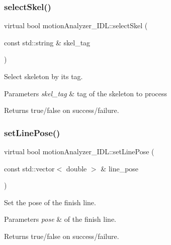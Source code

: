 \subsubsection{\texorpdfstring{select\+Skel()}{selectSkel()}}
{\footnotesize\ttfamily virtual bool motion\+Analyzer\+\_\+\+I\+D\+L\+::select\+Skel (\begin{DoxyParamCaption}\item[{const std\+::string \&}]{skel\+\_\+tag }\end{DoxyParamCaption})\hspace{0.3cm}{\ttfamily [virtual]}}



Select skeleton by its tag. 


\begin{DoxyParams}{Parameters}
{\em skel\+\_\+tag} & tag of the skeleton to process \\
\hline
\end{DoxyParams}
\begin{DoxyReturn}{Returns}
true/false on success/failure. 
\end{DoxyReturn}
\mbox{\label{classmotionAnalyzer__IDL_a9169bb6dd0ca068bd040bab9d93724ed}} 
\subsubsection{\texorpdfstring{set\+Line\+Pose()}{setLinePose()}}
{\footnotesize\ttfamily virtual bool motion\+Analyzer\+\_\+\+I\+D\+L\+::set\+Line\+Pose (\begin{DoxyParamCaption}\item[{const std\+::vector$<$ double $>$ \&}]{line\+\_\+pose }\end{DoxyParamCaption})\hspace{0.3cm}{\ttfamily [virtual]}}



Set the pose of the finish line. 


\begin{DoxyParams}{Parameters}
{\em pose} & of the finish line. \\
\hline
\end{DoxyParams}
\begin{DoxyReturn}{Returns}
true/false on success/failure. 
\end{DoxyReturn}
\mbox{\label{classmotionAnalyzer__IDL_ae6a1abf3aac4582688320f30a75bf768}} 
